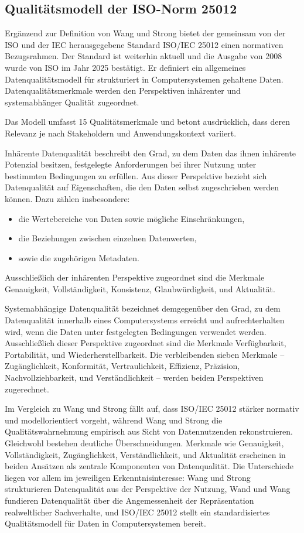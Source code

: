 \subsection{Qualitätsmodell der ISO-Norm 25012}

Ergänzend zur Definition von Wang und Strong bietet der gemeinsam von der \acrfull{ISO} und der \acrfull{IEC} herausgegebene Standard ISO/IEC 25012 einen normativen Bezugsrahmen.
Der Standard ist weiterhin aktuell und die Ausgabe von 2008 wurde von ISO im Jahr 2025 bestätigt.
Er definiert ein allgemeines Datenqualitätsmodell für strukturiert in Computersystemen gehaltene Daten.
Datenqualitätsmerkmale werden den Perspektiven inhärenter und systemabhänger Qualität zugeordnet. \cite{iso25012}

Das Modell umfasst 15 Qualitätsmerkmale und betont ausdrücklich, dass deren Relevanz je nach Stakeholdern und Anwendungskontext variiert.

Inhärente Datenqualität beschreibt den Grad, zu dem Daten das ihnen inhärente Potenzial besitzen, festgelegte Anforderungen bei ihrer Nutzung unter bestimmten Bedingungen zu erfüllen. Aus dieser Perspektive bezieht sich Datenqualität auf Eigenschaften, die den Daten selbst zugeschrieben werden können. Dazu zählen insbesondere:

\begin{itemize}
    \item die Wertebereiche von Daten sowie mögliche Einschränkungen,
    \item die Beziehungen zwischen einzelnen Datenwerten,
    \item sowie die zugehörigen Metadaten.
\end{itemize}

Ausschließlich der inhärenten Perspektive zugeordnet sind die Merkmale Genauigkeit, Vollständigkeit, Konsistenz, Glaubwürdigkeit, und Aktualität.

Systemabhängige Datenqualität bezeichnet demgegenüber den Grad, zu dem Datenqualität innerhalb eines Computersystems erreicht und aufrechterhalten wird, wenn die Daten unter festgelegten Bedingungen verwendet werden. Ausschließlich dieser Perspektive zugeordnet sind die Merkmale Verfügbarkeit, Portabilität, und Wiederherstellbarkeit. Die verbleibenden sieben Merkmale -- Zugänglichkeit, Konformität, Vertraulichkeit, Effizienz, Präzision, Nachvollziehbarkeit, und Verständlichkeit -- werden beiden Perspektiven zugerechnet.

Im Vergleich zu Wang und Strong fällt auf, dass ISO/IEC 25012 stärker normativ und modellorientiert vorgeht, während Wang und Strong die Qualitätswahrnehmung empirisch aus Sicht von Datennutzenden rekonstruieren. Gleichwohl bestehen deutliche Überschneidungen. Merkmale wie Genauigkeit, Vollständigkeit, Zugänglichkeit, Verständlichkeit, und Aktualität erscheinen in beiden Ansätzen als zentrale Komponenten von Datenqualität. Die Unterschiede liegen vor allem im jeweiligen Erkenntnisinteresse: Wang und Strong strukturieren Datenqualität aus der Perspektive der Nutzung, Wand und Wang fundieren Datenqualität über die Angemessenheit der Repräsentation realweltlicher Sachverhalte, und ISO/IEC 25012 stellt ein standardisiertes Qualitätsmodell für Daten in Computersystemen bereit.

